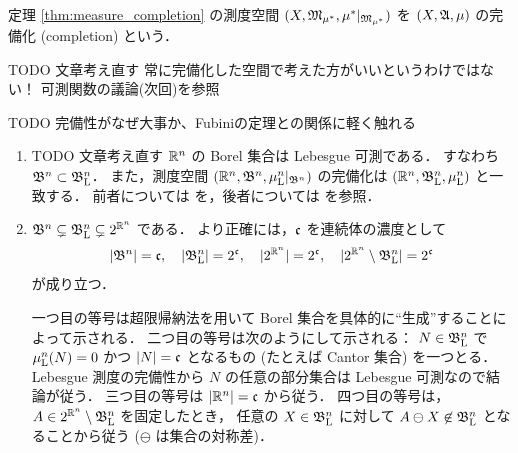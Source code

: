 \begin{definition}
    定理 \ref{thm:measure_completion} の測度空間 $(X,\mathfrak{M}_{\mu^*},\mu^\ast\vert_{\mathfrak{M}_{\mu^\ast}})$ を
    $(X,\mathfrak{A},\mu)$ の完備化 (completion) という．
\end{definition}

{\color{red} TODO 文章考え直す}
常に完備化した空間で考えた方がいいというわけではない！ 
可測関数の議論(次回)を参照

{\color{red} TODO 完備性がなぜ大事か、Fubiniの定理との関係に軽く触れる}

\begin{remark}\label{rem:Borel_Lebesgue}
    \leavevmode
    \begin{enumerate}
        \item
            {\color{red} TODO 文章考え直す}
            $\mathbb{R}^n$ の Borel 集合は Lebesgue 可測である．
            すなわち $\mathfrak{B}^n\subset\mathfrak{B}_{\mathrm{L}}^n$．
            また，測度空間 $(\mathbb{R}^n,\mathfrak{B}^n,\mu_{\mathrm{L}}^n\vert_{\mathfrak{B}^n})$ の完備化は
            $(\mathbb{R}^n,\mathfrak{B}_{\mathrm{L}}^n,\mu_{\mathrm{L}}^n)$ と一致する．
            前者については \cite[定理 7.2]{It63} を，後者については \cite[p.49]{It63} を参照．

        \item
            $\mathfrak{B}^n\subsetneq\mathfrak{B}_{\mathrm{L}}^n\subsetneq2^{\mathbb{R}^n}$ である．
            より正確には，$\mathfrak{c}$ を連続体の濃度として
            \begin{align}
                |\mathfrak{B}^n|=\mathfrak{c},\quad
                |\mathfrak{B}_{\mathrm{L}}^n|=2^{\mathfrak{c}},\quad
                |2^{\mathbb{R}^n}|=2^{\mathfrak{c}},\quad
                |2^{\mathbb{R}^n}\setminus\mathfrak{B}_{\mathrm{L}}^n|=2^{\mathfrak{c}}
            \end{align}
            が成り立つ．

            一つ目の等号は超限帰納法を用いて Borel 集合を具体的に``生成''することによって示される\cite{ms70880}．
            二つ目の等号は次のようにして示される：
            $N\in\mathfrak{B}_{\mathrm{L}}^n$ で $\mu_{\mathrm{L}}^n(N)=0$ かつ $|N|=\mathfrak{c}$ となるもの (たとえば Cantor 集合) を一つとる．
            Lebesgue 測度の完備性から $N$ の任意の部分集合は Lebesgue 可測なので結論が従う．
            三つ目の等号は $|\mathbb{R}^n|=\mathfrak{c}$ から従う．
            四つ目の等号は，$A\in2^{\mathbb{R}^n}\setminus\mathfrak{B}_{\mathrm{L}}^n$ を固定したとき，
            任意の $X\in\mathfrak{B}_{\mathrm{L}}^n$ に対して $A\ominus X\not\in\mathfrak{B}_{\mathrm{L}}^n$ となることから従う ($\ominus$ は集合の対称差)．


\end{enumerate}
\end{remark}

